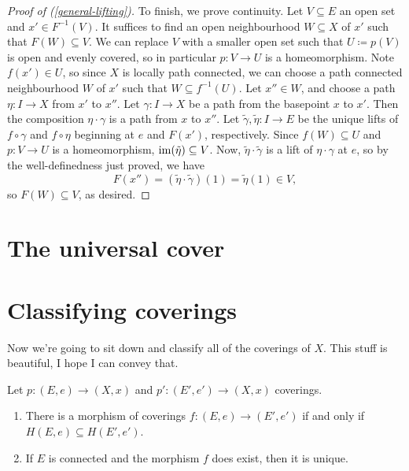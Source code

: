 \begin{proof}[Proof of (\ref{general-lifting})]
  To finish, we prove continuity. Let $V \subseteq E$ an open set and
  $x' \in F^{-1}(V)$. It suffices to find an open neighbourhood $W
  \subseteq X$ of $x'$ such that $F(W) \subseteq V$. We can replace
  $V$ with a smaller open set such that $U \coloneqq p(V)$ is open and
  evenly covered, so in particular $p : V \to U$ is a
  homeomorphism. Note $f(x') \in U$, so since $X$ is locally path
  connected, we can choose a path connected neighbourhood $W$ of $x'$
  such that $W \subseteq f^{-1}(U)$. Let $x'' \in W$, and choose a
  path $\eta : I \to X$ from $x'$ to $x''$. Let $\gamma : I \to X$ be
  a path from the basepoint $x$ to $x'$. Then the composition $\eta
  \cdot \gamma$ is a path from $x$ to $x''$. Let $\tilde\gamma,
  \tilde\eta : I \to E$ be the unique lifts of $f \circ \gamma$ and $f
  \circ \eta$ beginning at $e$ and $F(x')$, respectively. Since $f(W)
  \subseteq U$ and $p : V \to U$ is a homeomorphism, $\operatorname{im}(\tilde\eta)
  \subseteq V$. Now, $\tilde\eta \cdot \tilde\gamma$ is a lift of
  $\eta \cdot \gamma$ at $e$, so by the well-definedness just proved,
  we have
  \[
  F(x'') = (\tilde\eta \cdot \tilde\gamma)(1) = \tilde\eta(1) \in V,
  \]
  so $F(W) \subseteq V$, as desired.
\end{proof}


\section{The universal cover}


\section{Classifying coverings}

Now we're going to sit down and classify all of the coverings of
$X$. This stuff is beautiful, I hope I can convey that.

\begin{lemma}
  Let $p : (E,e) \to (X,x)$ and $p' : (E',e') \to (X,x)$
  coverings.
  \begin{enumerate}
  \item There is a morphism of coverings $f : (E,e) \to (E',e')$
    if and only if $H(E,e) \subseteq H(E',e')$.
  \item If $E$ is connected and the morphism $f$ does exist, then it
    is unique.
  \end{enumerate}
\end{lemma}

